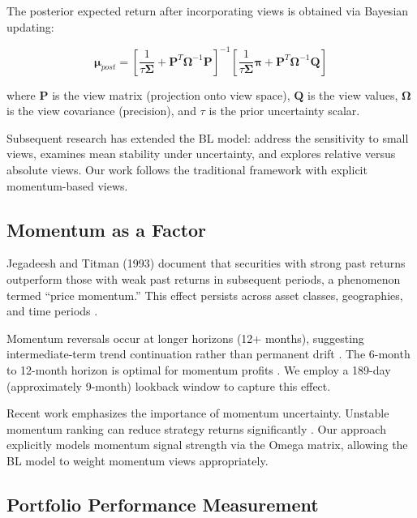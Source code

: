 \documentclass[12pt,a4paper]{article}
\begin{document}
The posterior expected return after incorporating views is obtained via Bayesian updating:

\begin{equation}
\boldsymbol{\mu}_{post} = \left[\frac{1}{\tau \boldsymbol{\Sigma}} + \mathbf{P}^T \boldsymbol{\Omega}^{-1} \mathbf{P}\right]^{-1} \left[\frac{1}{\tau \boldsymbol{\Sigma}} \boldsymbol{\pi} + \mathbf{P}^T \boldsymbol{\Omega}^{-1} \mathbf{Q}\right]
\end{equation}

where $\mathbf{P}$ is the view matrix (projection onto view space), $\mathbf{Q}$ is the view values, $\boldsymbol{\Omega}$ is the view covariance (precision), and $\tau$ is the prior uncertainty scalar.

Subsequent research has extended the BL model: \cite{he2005} address the sensitivity to small views, \cite{walters2011} examines mean stability under uncertainty, and \cite{johannesson2010} explores relative versus absolute views. Our work follows the traditional framework with explicit momentum-based views.

\subsection{Momentum as a Factor}

Jegadeesh and Titman (1993) document that securities with strong past returns outperform those with weak past returns in subsequent periods, a phenomenon termed ``price momentum.'' This effect persists across asset classes, geographies, and time periods \citep{asness2013}.

Momentum reversals occur at longer horizons (12+ months), suggesting intermediate-term trend continuation rather than permanent drift \citep{debondt1985}. The 6-month to 12-month horizon is optimal for momentum profits \citep{king2013}. We employ a 189-day (approximately 9-month) lookback window to capture this effect.

Recent work emphasizes the importance of momentum uncertainty. Unstable momentum ranking can reduce strategy returns significantly \citep{arnott2016}. Our approach explicitly models momentum signal strength via the Omega matrix, allowing the BL model to weight momentum views appropriately.

\subsection{Portfolio Performance Measurement}
\end{document}
